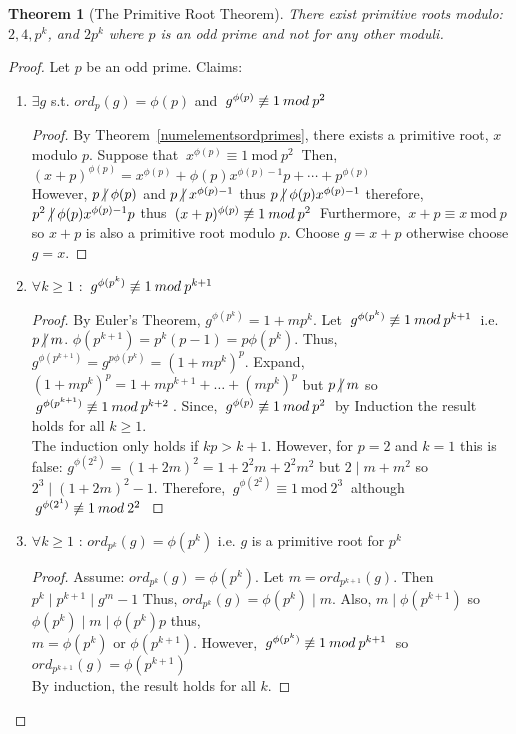 \documentclass[12pt]{extarticle}
\renewcommand\qedsymbol{$\square$}
\newcommand{\divides}{\mid}
\newcommand{\ndivides}{\centernot \mid}
\newtheorem{theorem}{Theorem}[section]
\newenvironment{lproof}{\begin{proof} \renewcommand{\qedsymbol}{}}{\end{proof}}
\renewcommand{\mod}[3]{\: #1 \equiv #2 \: \mathrm{mod} \: #3 \:}
\newcommand{\nmod}[3]{\: #1 \centernot \equiv #2 \: mod \: #3 \:}
\begin{document}
\begin{theorem}[The Primitive Root Theorem]
There exist primitive roots modulo: $2,4, p^k$, and  $2p^k$ where $p$ is an odd prime and not for any other moduli.
\end{theorem}

\begin{proof}
Let $p$ be an odd prime. Claims:

\begin{enumerate}
\item $\exists g$ s.t. $ord_p(g) = \phi (p)$ and $\nmod{g^{\phi (p)}}{1}{p^2}$

\begin{lproof}
By Theorem~\ref{numelementsordprimes}, there exists a primitive root, $x$ modulo $p$. Suppose that $\mod{x^{\phi (p)}}{1}{p^2}$ Then, $(x + p)^{\phi (p)} = x^{\phi(p)} + \phi(p) x^{\phi(p) - 1} p + \cdots + p^{\phi(p)}$ \\ However, $p\ndivides \phi(p)$ and $p \ndivides x^{\phi(p) - 1}$ thus $p \ndivides \phi(p) x^{\phi(p) - 1}$ therefore, $p^2 \ndivides \phi(p) x^{\phi(p) - 1}p$ thus $\nmod{(x+p)^{\phi(p)}}{1}{p^2}$ Furthermore, $\mod{x+p}{x}{p}$ so $x+p$ is also a primitive root modulo $p$. Choose $g = x+p$ otherwise choose $g = x$.
\end{lproof}

\item $\forall k \ge 1$ : $\nmod{g^{\phi(p^k)}}{1}{p^{k+1}}$ 

\begin{lproof}
 By Euler's Theorem, $g^{\phi(p^k)} = 1 + mp^k$. Let $\nmod{g^{\phi(p^k)}}{1}{p^{k+1}}$ i.e. $p \ndivides m$. $\phi(p^{k+1}) = p^k(p-1) = p\phi(p^k)$. Thus, $g^{\phi(p^{k+1})} = g^{p\phi(p^k)} = (1+mp^k)^p$. Expand, $(1+mp^k)^p = 1 + mp^{k+1} + \dots + (mp^k)^p$ but $p \ndivides m$ so $\nmod{g^{\phi(p^{k+1})}}{1}{p^{k+2}}$. Since, $\nmod{g^{\phi (p)}}{1}{p^2}$ by Induction the result holds for all $k \ge 1$. \\ The induction only holds if $kp > k+1$. However, for $p = 2$ and $k = 1$ this is false: $g^{\phi(2^2)} = (1+2m)^2 = 1+2^2m + 2^2m^2$ but $2 \divides m + m^2$ so $2^3 \divides (1+2m)^2-1$. Therefore, $\mod{g^{\phi(2^2)}}{1}{2^3}$ although $\nmod{g^{\phi(2^1)}}{1}{2^2}$
\end{lproof}

\item $\forall k \ge 1$ : $ord_{p^k}(g) = \phi(p^k)$ i.e. $g$ is a primitive root for $p^k$

\begin{lproof}
Assume: $ord_{p^k}(g) = \phi(p^k)$. Let $m = ord_{p^{k+1}}(g)$. Then $p^k \divides p^{k+1} \divides g^m - 1$ Thus, $ord_{p^k}(g) = \phi(p^k) \divides m$. Also, $m \divides \phi(p^{k+1})$ so $\phi(p^k) \divides m \divides \phi(p^k) p$ thus, \\
$m = \phi(p^k)$ or $\phi(p^{k+1})$. However, $\nmod{g^{\phi(p^k)}}{1}{p^{k+1}}$ so $ord_{p^{k+1}}(g) = \phi(p^{k+1})$ \\
By induction, the result holds for all $k$.
\end{lproof}


\end{enumerate}
\end{proof}
\end{document}
